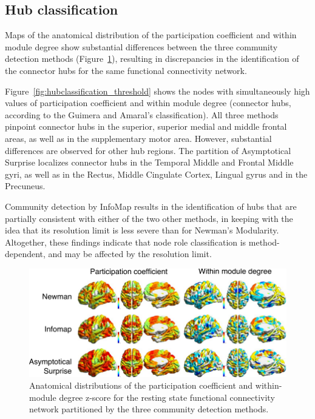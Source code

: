 \subsection{Hub classification}
Maps of the anatomical distribution of the participation coefficient and within module degree show substantial differences between the three community detection methods (Figure~\ref{fig:hubclassification}), resulting in discrepancies in the identification of the connector hubs for the same functional connectivity network.

Figure~\ref{fig:hubclassification_threshold} shows the nodes with simultaneously high values of participation coefficient and within module degree (connector hubs, according to the Guimera and Amaral's classification).
All three methods pinpoint connector hubs in the superior, superior medial and middle frontal areas, as well as in the supplementary motor area.
However, substantial differences are observed for other hub regions. The partition of Asymptotical Surprise localizes connector hubs in the Temporal Middle and Frontal Middle gyri, as well as in the Rectus, Middle Cingulate Cortex, Lingual gyrus and in the Precuneus.

Community detection by InfoMap results in the identification of hubs that are partially consistent with either of the two other methods, in keeping with the idea that its resolution limit is less severe than for Newman's Modularity.
Altogether, these findings indicate that node role classification is method-dependent, and may be affected by the resolution limit.

\begin{figure}[htb!]
\includegraphics[width=\textwidth]{images/pacopaperfigure8.pdf}
\caption{Anatomical distributions of the participation coefficient and within-module degree z-score for the resting state functional connectivity network partitioned by the three community detection methods.}
\label{fig:hubclassification}
\end{figure}


